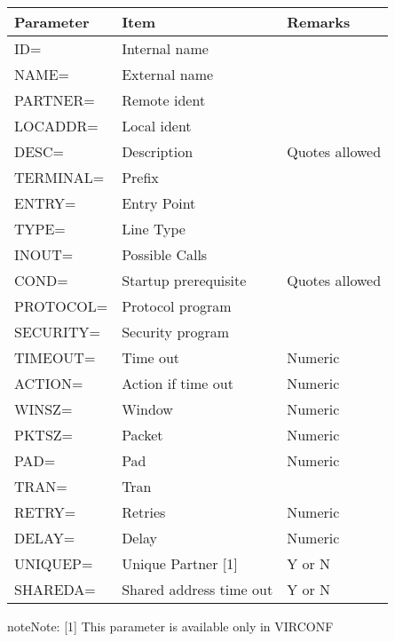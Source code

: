 \documentclass[letterpaper,10pt,english]{sphinxmanual}
\begin{document}
\begin{savenotes}\sphinxattablestart
\centering
\begin{tabulary}{\linewidth}[t]{|T|T|T|}
\hline
\sphinxstyletheadfamily 
Parameter
&\sphinxstyletheadfamily 
Item
&\sphinxstyletheadfamily 
Remarks
\\
\hline
ID=
&
Internal name
&\\
\hline
NAME=
&
External name
&\\
\hline
PARTNER=
&
Remote ident
&\\
\hline
LOCADDR=
&
Local ident
&\\
\hline
DESC=
&
Description
&
Quotes allowed
\\
\hline
TERMINAL=
&
Prefix
&\\
\hline
ENTRY=
&
Entry Point
&\\
\hline
TYPE=
&
Line Type
&\\
\hline
INOUT=
&
Possible Calls
&\\
\hline
COND=
&
Startup
prerequisite
&
Quotes allowed
\\
\hline
PROTOCOL=
&
Protocol program
&\\
\hline
SECURITY=
&
Security program
&\\
\hline
TIMEOUT=
&
Time out
&
Numeric
\\
\hline
ACTION=
&
Action if
time out
&
Numeric
\\
\hline
WINSZ=
&
Window
&
Numeric
\\
\hline
PKTSZ=
&
Packet
&
Numeric
\\
\hline
PAD=
&
Pad
&
Numeric
\\
\hline
TRAN=
&
Tran
&\\
\hline
RETRY=
&
Retries
&
Numeric
\\
\hline
DELAY=
&
Delay
&
Numeric
\\
\hline
UNIQUEP=
&
Unique Partner {[}1{]}
&
Y or N
\\
\hline
SHAREDA=
&
Shared address
time out
&
Y or N
\\
\hline
\end{tabulary}
\par
\sphinxattableend\end{savenotes}

\begin{sphinxadmonition}{note}{Note:}
{[}1{]} This parameter is available only in VIRCONF
\end{sphinxadmonition}

\ignorespaces 
\end{document}
